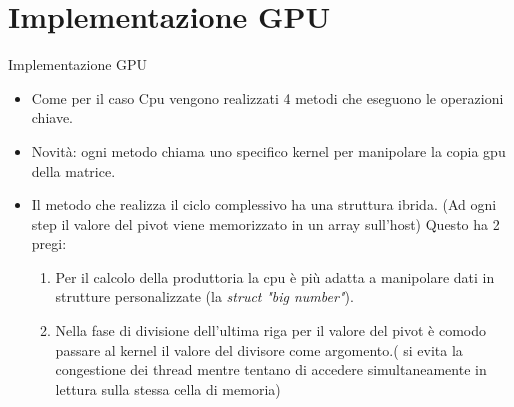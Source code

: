 \documentclass{beamer} %
\begin{document}
\section{Implementazione GPU}
\begin{frame}{Implementazione GPU}
\begin{itemize}
\item Come per il caso Cpu vengono realizzati 4 metodi che eseguono le operazioni chiave.\pause
\item Novità: ogni metodo chiama uno specifico kernel per manipolare la copia gpu della matrice.\pause
\item Il metodo che realizza  il ciclo complessivo ha una struttura ibrida. \tiny (Ad ogni step il valore del pivot viene memorizzato in un array sull'host) 
\vspace{1cm}
\normalsize Questo ha 2 pregi:\pause
	\begin{enumerate}
	\item Per il calcolo della produttoria la cpu è più adatta a manipolare dati in strutture personalizzate (la \textit{struct} \emph{"big number"}).
	\pause
	\item Nella fase di divisione dell'ultima riga per il valore del pivot è comodo passare al kernel il valore del divisore come argomento.\newline \tiny ( si evita la congestione dei thread mentre tentano di accedere simultaneamente in lettura sulla stessa cella di memoria) 
	\end{enumerate}
\end{itemize}

\end{frame}
\end{document}

